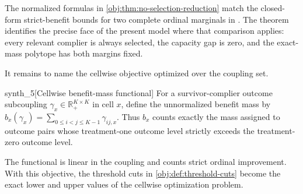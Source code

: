 The normalized formulas in \cref{obj:thm:no-selection-reduction} match the closed-form strict-benefit bounds for two complete ordinal marginals in \citet[Proposition 2, equation (6), p.~546]{LuDingDasgupta2018}. The theorem identifies the precise face of the present model where that comparison applies: every relevant complier is always selected, the capacity gap is zero, and the exact-mass polytope has both margins fixed.

It remains to name the cellwise objective optimized over the coupling set.

\begin{definitionv}{synth_5}[Cellwise benefit-mass functional]
For a survivor-complier outcome subcoupling $\gamma_x\in\mathbb R_+^{K\times K}$ in cell $x$, define the unnormalized benefit mass by $b_x(\gamma_x)=\sum_{0\le i<j\le K-1}\gamma_{ij,x}$. Thus $b_x$ counts exactly the mass assigned to outcome pairs whose treatment-one outcome level strictly exceeds the treatment-zero outcome level.
\end{definitionv}

The functional  is linear in the coupling and counts strict ordinal improvement. With this objective, the threshold cuts in \cref{obj:def:threshold-cuts} become the exact lower and upper values of the cellwise optimization problem.

